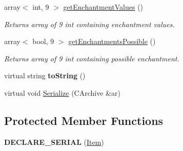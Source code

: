 \begin{DoxyCompactItemize}
\hypertarget{class_item_aeb68ae1ad1733a66ca3fc85b13a86f82}{}\label{class_item_aeb68ae1ad1733a66ca3fc85b13a86f82} 
array$<$ int, 9 $>$ \hyperlink{class_item_aeb68ae1ad1733a66ca3fc85b13a86f82}{get\+Enchantment\+Values} ()
\begin{DoxyCompactList}\small\item\em Returns array of 9 int containing enchantment values. \end{DoxyCompactList}\item 
\hypertarget{class_item_af4bea219b51babc0cee62a949a79a46d}{}\label{class_item_af4bea219b51babc0cee62a949a79a46d} 
array$<$ bool, 9 $>$ \hyperlink{class_item_af4bea219b51babc0cee62a949a79a46d}{get\+Enchantments\+Possible} ()
\begin{DoxyCompactList}\small\item\em Returns array of 9 int containing possible enchantment. \end{DoxyCompactList}\item 
\hypertarget{class_item_a916034b979ec9c4356a062a197fc2af7}{}\label{class_item_a916034b979ec9c4356a062a197fc2af7} 
virtual string {\bfseries to\+String} ()
\item 
virtual void \hyperlink{class_item_ad1eae21e57fc3ce3252080a4efbfb8e8}{Serialize} (C\+Archive \&ar)
\end{DoxyCompactItemize}
\subsection*{Protected Member Functions}
\begin{DoxyCompactItemize}
\item 
\hypertarget{class_item_aceed71a49985945d19f9a11380f27036}{}\label{class_item_aceed71a49985945d19f9a11380f27036} 
{\bfseries D\+E\+C\+L\+A\+R\+E\+\_\+\+S\+E\+R\+I\+AL} (\hyperlink{class_item}{Item})
\end{DoxyCompactItemize}
